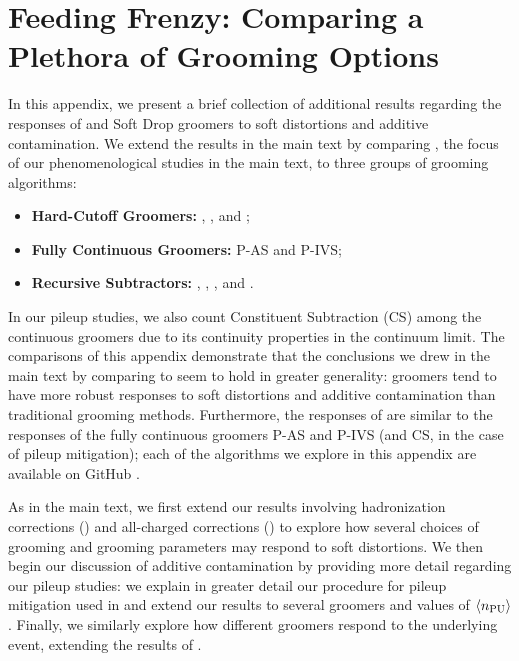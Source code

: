 \section{Feeding Frenzy: Comparing a Plethora of Grooming Options}
\label{app:feedingfrenzy}
In this appendix, we present a brief collection of additional results regarding the responses of \PIRANHA{} and Soft Drop groomers to soft distortions and additive contamination.
%
We extend the results in the main text by comparing , the focus of our phenomenological studies in the main text, to three groups of grooming algorithms:
%
\begin{itemize}
    \item
    \textbf{Hard-Cutoff Groomers:}
    , , and ;

    \item
    \textbf{Fully Continuous Groomers:}
    P-AS and P-IVS;

    \item
    \textbf{Recursive Subtractors:}
    , , , and .
\end{itemize}
In our pileup studies, we also count Constituent Subtraction (CS) \cite{Berta:2014eza} among the continuous groomers due to its continuity properties in the continuum limit.
%
The comparisons of this appendix demonstrate that the conclusions we drew in the main text by comparing  to  seem to hold in greater generality:
%
\PIRANHA{} groomers tend to have more robust responses to soft distortions and additive contamination than traditional grooming methods.
%
Furthermore, the responses of  are similar to the responses of the fully continuous groomers P-AS and P-IVS (and CS, in the case of pileup mitigation);
%
each of the \PIRANHA{} algorithms we explore in this appendix are available on GitHub \cite{piranhagithub}.

As in the main text, we first extend our results involving hadronization corrections () and all-charged corrections () to explore how several choices of grooming and grooming parameters may respond to soft distortions.
%
We then begin our discussion of additive contamination by providing more detail regarding our pileup studies:
%
we explain in greater detail our procedure for pileup mitigation used in  and extend our results to several groomers and values of \(\langle n_{\rm PU}\rangle\).
%
Finally, we similarly explore how different groomers respond to the underlying event, extending the results of .


